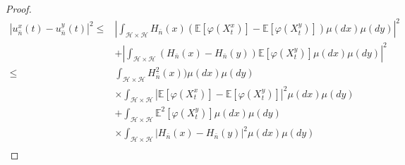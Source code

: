 \documentclass[]{interact}
\newcommand{\E}{\mathbb{E}}
\theoremstyle{plain}%
\theoremstyle{definition}
\theoremstyle{remark}
\begin{document}
\begin{proof}
\begin{equation}
\begin{aligned}
                |u_{\bar n} ^ x(t) - u_{\bar n} ^ y(t)| ^ 2
                    \le&
                    \left|
                        \int_{\mathcal{H} 
                        \times
                        \mathcal{H}} H_{\bar n}(x)
                        \left(
                            \E
                             \left[
                                \varphi(X_t^x)
                             \right]
                             -
                            \E\left[
                                \varphi(X_t^y)
                            \right]
                        \right) \mu(dx)\mu(dy)
                    \right|^2
                    \\
                    &+
                    \left|
                        \int_{\mathcal{H}
                        \times
                        \mathcal{H}
                        }
                        \left(
                            H_{\bar n}(x) - H_{\bar n}(y)
                        \right)
                        \E\left[
                            \varphi(X_t ^ y)
                        \right]
                        \mu(dx)\mu(dy)
                    \right|^2
                    \\
                    \le &
                    \int_{\mathcal{H}\times \mathcal{H}}
                        H_{\bar n}^2(x))
                    \mu(dx)\mu(dy)
                    \\
                    &\times
                        \int_{\mathcal{H}\times \mathcal{H}}
                        \left|
                            \E\left [
                                \varphi(X_t^x)
                            \right]
                            -
                            \E\left[
                                \varphi(X_t^y)
                            \right]
                        \right|^2
                        \mu(dx)\mu(dy)
                    \\
                    &+
                    \int_{\mathcal{H} \times \mathcal{H}}
                        \E^2
                        \left[
                            \varphi(X_t^y)
                        \right]
                    \mu(dx)\mu(dy)
                    \\
                     &\times
                    \int_{\mathcal{H}\times \mathcal{H}}
                    \left|
                        H_{\bar n}(x)-H_{\bar n}(y)
                    \right|^2
                    \mu(dx)\mu(dy)
                    \\

\end{aligned}
\end{equation}
\end{proof}
\end{document}
